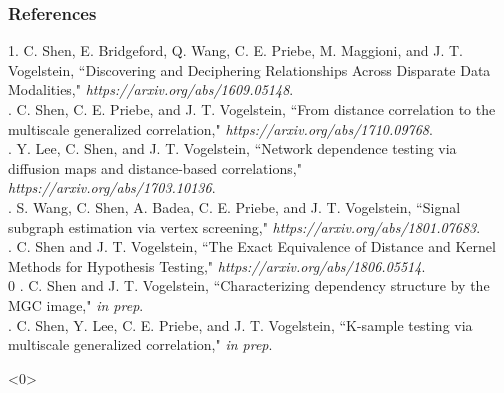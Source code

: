 \documentclass[mathserif,t]{beamer}
\newcommand{\blind}{0}
\begin{document}
\begin{frame}%
\frametitle{References}
\small

1. \textcolor{UniOrange}{C. Shen}, E. Bridgeford, Q. Wang, C. E. Priebe, M. Maggioni, and J. T. Vogelstein,
``Discovering and Deciphering Relationships Across Disparate Data Modalities," \textit{https://arxiv.org/abs/1609.05148}.\\
. \textcolor{UniOrange}{C. Shen}, C. E. Priebe, and J. T. Vogelstein, ``From distance correlation to the
multiscale generalized correlation," \textit{https://arxiv.org/abs/1710.09768}.\\
. Y. Lee, \textcolor{UniOrange}{C. Shen}, and J. T. Vogelstein, ``Network dependence testing via diffusion
maps and distance-based correlations," \textit{https://arxiv.org/abs/1703.10136}.\\
. S. Wang, \textcolor{UniOrange}{C. Shen}, A. Badea, C. E. Priebe, and J. T. Vogelstein, ``Signal
subgraph estimation via vertex screening," \textit{https://arxiv.org/abs/1801.07683}.\\
. \textcolor{UniOrange}{C. Shen} and J. T. Vogelstein, ``The Exact Equivalence of Distance and Kernel Methods for Hypothesis Testing," \textit{https://arxiv.org/abs/1806.05514}.\\
\blind
{
. \textcolor{UniOrange}{C. Shen} and J. T. Vogelstein, ``Characterizing dependency structure by the MGC image," \textit{in prep}.\\
. \textcolor{UniOrange}{C. Shen}, Y. Lee, C. E. Priebe, and J. T. Vogelstein, ``K-sample testing via
multiscale generalized correlation," \textit{in prep}.
}\fi
%
%
\end{frame}

\addtocounter{framenumber}{-1} 
\begin{frame}<0> 

\end{frame} 
%

\end{document}
